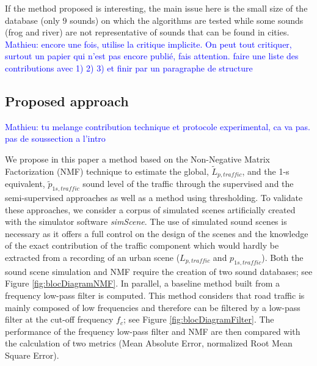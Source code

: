 \documentclass[twocolumn,a4paper,10pt]{article}
\newcommand{\ml}[1]{\textcolor{blue}{ Mathieu: #1}}
\begin{document}
 If the method proposed is interesting, the main issue here is the small size of the database (only 9 sounds) on which the algorithms are tested while some sounds (frog and river) are not representative of sounds that can be found in cities.
 \ml{encore une fois, utilise la critique implicite. On peut tout critiquer, surtout un papier qui n'est pas encore publié, fais attention. faire une liste des contributions avec 1) 2) 3) et finir par un paragraphe de structure}

\subsection{Proposed approach}

\ml{tu melange contribution technique et protocole experimental, ca va pas. pas de soussection a l'intro}

We propose in this paper a method based on the Non-Negative Matrix Factorization (NMF) technique to estimate the global, $\tilde{L}_{p,traffic}$, and the 1-s equivalent, $\tilde{p}_{1s,traffic}$ sound level of the traffic through the supervised and the semi-supervised approaches as well as a method using thresholding. To validate these approaches, we consider a corpus of simulated scenes artificially created with the simulator software \textit{simScene}. The use of simulated sound scenes is necessary as it offers a full control on the design of the scenes and the knowledge of the exact contribution of the traffic component which would hardly be extracted from a recording of an urban scene ($L_{p,traffic}$ and $p_{1s,traffic}$). Both the sound scene simulation and NMF require the creation of two sound databases; see Figure \ref{fig:blocDiagramNMF}. In parallel, a baseline method built from a frequency low-pass filter is computed. This method considers that road traffic is mainly composed of low frequencies and therefore can be filtered by a low-pass filter at the cut-off frequency $f_c$; see Figure \ref{fig:blocDiagramFilter}. The performance of the frequency low-pass filter and NMF are then compared with the calculation of two metrics (Mean Absolute Error, normalized Root Mean Square Error).
\end{document}

